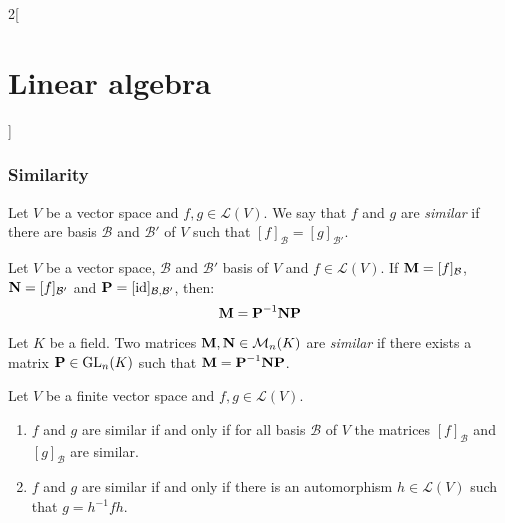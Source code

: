 \documentclass[../../../main.tex]{subfiles}
\begin{document}
\begin{multicols}{2}[\section{Linear algebra}]
  \subsubsection{Similarity}
  \begin{definition}
    Let $V$ be a vector space and $f,g\in\mathcal{L}(V)$. We say that $f$ and $g$ are \textit{similar} if there are basis $\mathcal{B}$ and $\mathcal{B}'$ of $V$ such that $[f]_\mathcal{B}=[g]_{\mathcal{B}'}$.
  \end{definition}
  \begin{lemma}
    Let $V$ be a vector space, $\mathcal{B}$ and $\mathcal{B}'$ basis of $V$ and $f\in\mathcal{L}(V)$. If $\boldsymbol{\mathrm{M}}=[f]_\mathcal{B}$, $\boldsymbol{\mathrm{N}}=[f]_{\mathcal{B}'}$ and $\boldsymbol{\mathrm{P}}=[\mathrm{id}]_{\mathcal{B},\mathcal{B}'}$, then: $$\boldsymbol{\mathrm{M}}=\boldsymbol{\mathrm{P}}^{-1}\boldsymbol{\mathrm{N}}\boldsymbol{\mathrm{P}}$$
  \end{lemma}
  \begin{definition}
    Let $K$ be a field. Two matrices $\boldsymbol{\mathrm{M}}, \boldsymbol{\mathrm{N}}\in\mathcal{M}_n(K)$ are \textit{similar} if there exists a matrix $\boldsymbol{\mathrm{P}}\in\mathrm{GL}_n(K)$ such that $\boldsymbol{\mathrm{M}}=\boldsymbol{\mathrm{P}}^{-1}\boldsymbol{\mathrm{N}}\boldsymbol{\mathrm{P}}$.
  \end{definition}
  \begin{prop}
    Let $V$ be a finite vector space and $f,g\in\mathcal{L}(V)$.
    \begin{enumerate}
      \item $f$ and $g$ are similar if and only if for all basis $\mathcal{B}$ of $V$ the matrices $[f]_\mathcal{B}$ and $[g]_\mathcal{B}$ are similar.
      \item $f$ and $g$ are similar if and only if there is an automorphism $h\in\mathcal{L}(V)$ such that $g=h^{-1}fh$.
    \end{enumerate}
  \end{prop}

\end{multicols}
\end{document}
